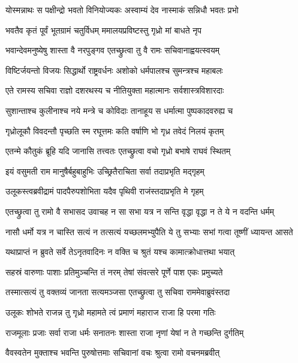 \twolineshloka
{योस्मन्नाथः स पक्षीन्द्रो भवतो विनियोज्यकः}
{अस्वाम्यं देव नास्माकं सन्निधौ भवतः प्रभो}%

\twolineshloka
{भवतैव कृतं पूर्वं भूतग्रामं चतुर्विधम्}
{ममालयप्रविष्टस्तु गृध्रो मां बाधते नृप}%

\twolineshloka
{भवान्देवमनुष्येषु शास्ता वै नरपुङ्गव}
{एतच्छ्रुत्वा तु वै रामः सचिवानाह्वयत्स्वयम्}%

\twolineshloka
{विष्टिर्जयन्तो विजयः सिद्धार्थो राष्ट्रवर्धनः}
{अशोको धर्मपालश्च सुमन्त्रश्च महाबलः}%

\twolineshloka
{एते रामस्य सचिवा राज्ञो दशरथस्य च}
{नीतियुक्ता महात्मानः सर्वशास्त्रविशारदाः}%

\twolineshloka
{सुशान्ताश्च कुलीनाश्च नये मन्त्रे च कोविदाः}
{तानाहूय स धर्मात्मा पुष्पकादवरुह्य च}%

\twolineshloka
{गृध्रोलूकौ विवदन्तौ पृच्छति स्म रघूत्तमः}
{कति वर्षाणि भो गृध्र तवेदं निलयं कृतम्}%

\twolineshloka
{एतन्मे कौतुकं ब्रूहि यदि जानासि तत्त्वतः}
{एतच्छ्रुत्वा वचो गृध्रो बभाषे राघवं स्थितम्}%

\twolineshloka
{इयं वसुमती राम मानुषैर्बहुबाहुभिः}
{उच्छ्रितैराचिता सर्वा तदाप्रभृति मद्गृहम्}%

\twolineshloka
{उलूकस्त्वब्रवीद्रामं पादपैरुपशोभिता}
{यदैव पृथिवी राजंस्तदाप्रभृति मे गृहम्}%

\twolineshloka
{एतच्छ्रुत्वा तु रामो वै सभासद उवाचह}
{न सा सभा यत्र न सन्ति वृद्धा वृद्धा न ते ये न वदन्ति धर्मम्}%

\twolineshloka
{नासौ धर्मो यत्र न चास्ति सत्यं न तत्सत्यं यच्छलमभ्युपैति}
{ये तु सभ्याः सभां गत्वा तूष्णीं ध्यायन्त आसते}%

\twolineshloka
{यथाप्राप्तं न ब्रुवते सर्वे तेऽनृतवादिनः}
{न वक्ति च श्रुतं यश्च कामात्क्रोधात्तथा भयात्}%

\twolineshloka
{सहस्रं वारुणाः पाशाः प्रतिमुञ्चन्ति तं नरम्}
{तेषां संवत्सरे पूर्णे पाश एकः प्रमुच्यते}%

\twolineshloka
{तस्मात्सत्यं तु वक्तव्यं जानता सत्यमञ्जसा}
{एतच्छ्रुत्वा तु सचिवा राममेवाब्रुवंस्तदा}%

\twolineshloka
{उलूकः शोभते राजन्न तु गृध्रो महामते}
{त्वं प्रमाणं महाराज राजा हि परमा गतिः}%

\twolineshloka
{राजमूलाः प्रजाः सर्वा राजा धर्मः सनातनः}
{शास्ता राजा नृणां येषां न ते गच्छन्ति दुर्गतिम्}%

\twolineshloka
{वैवस्वतेन मुक्ताश्च भवन्ति पुरुषोत्तमाः}
{सचिवानां वचः श्रुत्वा रामो वचनमब्रवीत्}%

